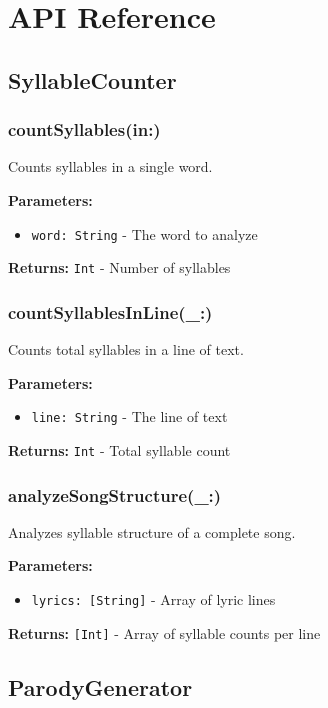 \documentclass[11pt,a4paper]{article}
\begin{document}
\section{API Reference}

\subsection{SyllableCounter}

\subsubsection{countSyllables(in:)}
Counts syllables in a single word.

\textbf{Parameters:}
\begin{itemize}
    \item \texttt{word: String} - The word to analyze
\end{itemize}

\textbf{Returns:} \texttt{Int} - Number of syllables

\subsubsection{countSyllablesInLine(\_:)}
Counts total syllables in a line of text.

\textbf{Parameters:}
\begin{itemize}
    \item \texttt{line: String} - The line of text
\end{itemize}

\textbf{Returns:} \texttt{Int} - Total syllable count

\subsubsection{analyzeSongStructure(\_:)}
Analyzes syllable structure of a complete song.

\textbf{Parameters:}
\begin{itemize}
    \item \texttt{lyrics: [String]} - Array of lyric lines
\end{itemize}

\textbf{Returns:} \texttt{[Int]} - Array of syllable counts per line

\subsection{ParodyGenerator}
\end{document}
